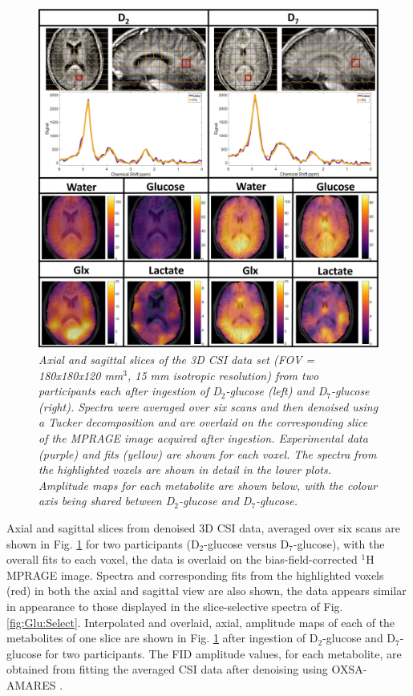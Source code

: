\begin{figure}
    \centering
    \includegraphics[width = 1\textwidth]{Figures/Glucose/CSI.png}
    \caption{\textit{Axial and sagittal slices of the 3D \ac{CSI} data set (\ac{FOV} = 180x180x120 mm$^3$, 15 mm isotropic resolution) from two participants each after ingestion of D$_2$-glucose (left) and D$_7$-glucose (right). Spectra were averaged over six scans and then denoised using a Tucker decomposition and are overlaid on the corresponding slice of the \ac{MPRAGE} image acquired after ingestion. Experimental data (purple) and fits (yellow) are shown for each voxel. The spectra from the highlighted voxels are shown in detail in the lower plots. Amplitude maps for each metabolite are shown below, with the colour axis being shared between D$_2$-glucose and D$_7$-glucose.}}
    \label{fig:Glu:CSI}
\end{figure}

Axial and sagittal slices from denoised 3D \ac{CSI} data, averaged over six scans are shown in Fig. \ref{fig:Glu:CSI} for two participants (D$_2$-glucose versus D$_7$-glucose), with the overall fits to each voxel, the data is overlaid on the bias-field-corrected $^1$H \ac{MPRAGE} image. Spectra and corresponding fits from the highlighted voxels (red) in both the axial and sagittal view are also shown, the data appears similar in appearance to those displayed in the slice-selective spectra of Fig. \ref{fig:Glu:Select}. Interpolated and overlaid, axial, amplitude maps of each of the metabolites of one slice are shown in Fig. \ref{fig:Glu:CSI} after ingestion of D$_2$-glucose and D$_7$-glucose for two participants. The \ac{FID} amplitude values, for each metabolite, are obtained from fitting the averaged \ac{CSI} data after denoising using OXSA-AMARES \cite{Vanhamme1997ImprovedKnowledge, Purvis2017OXSA:MATLAB}.

